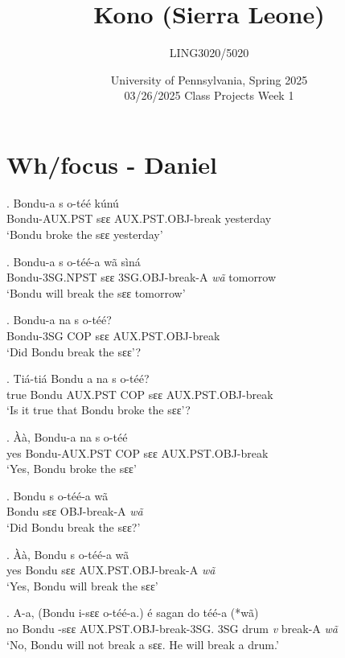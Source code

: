 \documentclass{assets/fieldnotes}
\title{Kono (Sierra Leone)}
\author{LING3020/5020}
\date{University of Pennsylvania, Spring 2025\\03/26/2025 Class Projects Week 1}
\begin{document}
\maketitle

\maketitle
\tableofcontents


\section{Wh/focus - Daniel}
\exg. Bondu-a s o-téé kúnú\\
Bondu-AUX.PST sɛɛ AUX.PST.OBJ-break yesterday\\
`Bondu broke the sɛɛ yesterday'

\exg. Bondu-a s o-téé-a wã sìná\\
Bondu-3SG.NPST sɛɛ 3SG.OBJ-break-A \textit{wã} tomorrow\\
`Bondu will break the sɛɛ tomorrow'

\exg. Bondu-a na s o-téé?\\
Bondu-3SG COP sɛɛ AUX.PST.OBJ-break\\
`Did Bondu break the sɛɛ'?

\exg. Tiá-tiá Bondu a na s o-téé?\\
true Bondu AUX.PST COP sɛɛ AUX.PST.OBJ-break\\
`Is it true that Bondu broke the sɛɛ'?\\

\exg. Àà, Bondu-a na s o-téé\\
yes Bondu-AUX.PST COP sɛɛ AUX.PST.OBJ-break\\
`Yes, Bondu broke the sɛɛ'


\exg. Bondu s o-téé-a wã\\
Bondu sɛɛ OBJ-break-A \textit{wã}\\
`Did Bondu break the sɛɛ?'
 
\exg. Àà, Bondu s o-téé-a wã\\
yes Bondu sɛɛ AUX.PST.OBJ-break-A \textit{wã}\\
`Yes, Bondu will break the sɛɛ'

\exg. A-a, (Bondu i-sɛɛ o-téé-a.) é sagan do téé-a (*wã)\\
no Bondu \Neg{}-sɛɛ AUX.PST.OBJ-break-3SG. 3SG drum \textit{v} break-A \textit{wã}\\
`No, Bondu will not break a sɛɛ. He will break a drum.'
\end{document}
